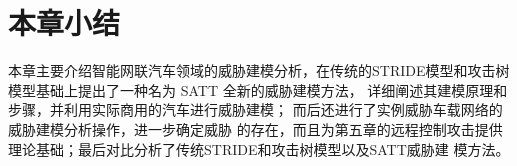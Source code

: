 \section{本章小结}
本章主要介绍智能网联汽车领域的威胁建模分析，在传统的STRIDE模型和攻击树模型基础上提出了一种名为 SATT 全新的威胁建模方法，
详细阐述其建模原理和步骤，并利用实际商用的汽车进行威胁建模；
而后还进行了实例威胁车载网络的威胁建模分析操作，进一步确定威胁
的存在，而且为第五章的远程控制攻击提供理论基础；最后对比分析了传统STRIDE和攻击树模型以及SATT威胁建
模方法。